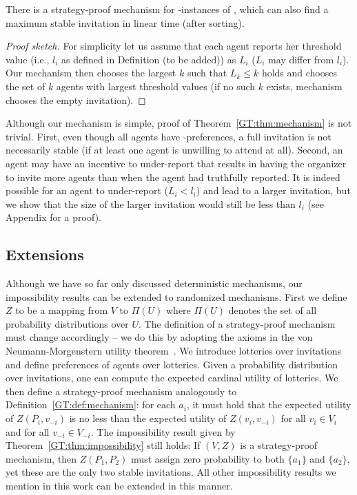 \begin{theorem} \label{GT:thm:mechanism}
	There is a strategy-proof mechanism for \INC-instances of \ASIP, which can also find a maximum stable invitation in linear time (after sorting). 
\end{theorem}
\begin{proof}[Proof sketch]
For simplicity let us assume that each agent reports her threshold value (i.e., $l_i$ as defined in Definition (to be added)) as $L_i$ ($L_i$ may differ from $l_i$). 
Our mechanism then chooses the largest $k$ such that $L_k \leq k$ holds and chooses the set of $k$ agents with largest threshold values (if no such $k$ exists, mechanism chooses the empty invitation). 
\end{proof}
	Although our mechanism is simple, proof of Theorem~\ref{GT:thm:mechanism} is not trivial. First, even though all agents have \INC-preferences, a full invitation is not necessarily stable (if at least one agent is unwilling to attend at all). Second, an agent may have an incentive to under-report that results in having the organizer to invite more agents than when the agent had truthfully reported. It is indeed possible for an agent to under-report ($L_i < l_i$) and lead to a larger invitation, but we show that the size of the larger invitation would still be less than $l_i$ (see Appendix for a proof). 


\subsection{Extensions} \label{GT:sec:asip_extension}
Although we have so far only discussed deterministic mechanisms, our impossibility results can be extended to randomized mechanisms. First we define $Z$ to be a mapping from $V$ to $\Pi(U)$ where $\Pi(U)$ denotes the set of all probability distributions over $U$. The definition of a strategy-proof mechanism must change accordingly -- we do this by adopting the axioms in the von Neumann-Morgenstern utility theorem~\cite{von1947theory}. We introduce lotteries over invitations and define preferences of agents over lotteries. Given a probability distribution over invitations, one can compute the expected cardinal utility of lotteries. We then define a strategy-proof mechanism analogously to Definition~\ref{GT:def:mechanism}: for each $a_i$, it must hold that the expected utility of $Z(P_i, v_{-i})$ is no less than the expected utility of $Z(v_i, v_{-i})$ for all $v_i\in V_i$ and for all $v_{-i} \in V_{-i}$. The impossibility result given by Theorem~\ref{GT:thm:impossibility} still holds: If $(V, Z)$ is a strategy-proof mechanism, then $Z(P_1, P_2)$ must assign zero probability to both $\{a_1\}$ and $\{a_2\}$, yet these are the only two stable invitations.  All other impossibility results we mention in this work can be extended in this manner.

